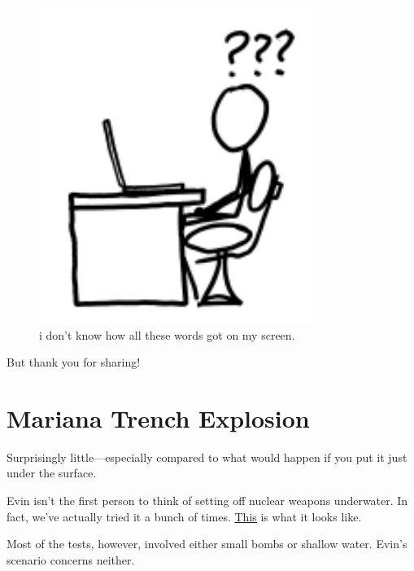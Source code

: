 \begin{figure}[!htbp]
\centering
\includegraphics[scale=0.5, max width=0.8\textwidth]{imgs/a/14/short_answers_headscratch.png}
\caption{i don't know how all these words got on my screen.}
\end{figure}

{But thank you for sharing!}

{
\chapter{Mariana Trench Explosion}
}

\hfill{}

{Surprisingly little—especially compared to what would happen if you put it just under the surface.}

{Evin isn’t the first person to think of setting off nuclear weapons underwater. In fact, we’ve actually tried it a bunch of times. \href{http://www.youtube.com/watch?v=ggH-ObiUWEE}{This} is what it looks like.}

{Most of the tests, however, involved either small bombs or shallow water. Evin’s scenario concerns neither.}

